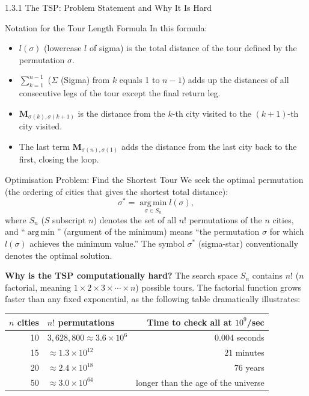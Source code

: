 \documentclass[aspectratio=169,10pt]{beamer}
\begin{document}
\begin{frame}[allowframebreaks]{1.3.1 The TSP: Problem Statement and Why It Is Hard}
  \begin{block}{Notation for the Tour Length Formula}
    In this formula:
    \begin{itemize}
      \item $l(\sigma)$ (lowercase $l$ of sigma) is the total distance of
        the tour defined by the permutation $\sigma$.
      \item $\sum_{k=1}^{n-1}$ ($\Sigma$ (Sigma) from $k$ equals 1 to $n-1$)
        adds up the distances of all consecutive legs of the tour except the
        final return leg.
      \item $\mathbf{M}_{\sigma(k),\sigma(k+1)}$ is the distance from the
        $k$-th city visited to the $(k+1)$-th city visited.
      \item The last term $\mathbf{M}_{\sigma(n),\sigma(1)}$ adds the distance
        from the last city back to the first, closing the loop.
    \end{itemize}
  \end{block}

  \begin{block}{Optimisation Problem: Find the Shortest Tour}
    We seek the optimal permutation (the ordering of cities that gives the
    shortest total distance):
    \[
      \sigma^* = \operatorname*{arg\,min}_{\sigma \in S_n} l(\sigma),
    \]
    where $S_n$ ($S$ subscript $n$) denotes the set of all $n!$ permutations of
    the $n$ cities, and ``$\operatorname{arg\,min}$'' (argument of the minimum)
    means ``the permutation $\sigma$ for which $l(\sigma)$ achieves the minimum
    value.''  The symbol $\sigma^*$ (sigma-star) conventionally denotes the
    optimal solution.
  \end{block}

  \framebreak

  \textbf{Why is the TSP computationally hard?}  The search space $S_n$
  contains $n!$ ($n$ factorial, meaning $1 \times 2 \times 3 \times \cdots
  \times n$) possible tours.  The factorial function grows faster than any fixed
  exponential, as the following table dramatically illustrates:

  \begin{center}
  \begin{tabular}{rlr}
    \toprule
    $n$ cities & $n!$ permutations & Time to check all at $10^9$/sec \\
    \midrule
    10  & $3{,}628{,}800 \approx 3.6 \times 10^6$  & $0.004$ seconds \\
    15  & $\approx 1.3 \times 10^{12}$  & $21$ minutes \\
    20  & $\approx 2.4 \times 10^{18}$  & $76$ years \\
    50  & $\approx 3.0 \times 10^{64}$  & longer than the age of the universe \\
    \bottomrule
  \end{tabular}
  \end{center}


\end{frame}
\end{document}
